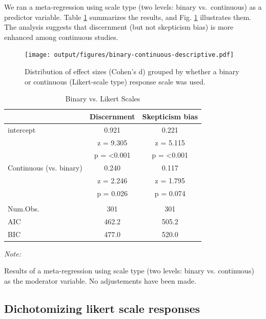 \documentclass[
  doc,floatsintext]{apa6}
\begin{document}
We ran a meta-regression using scale type (two levels: binary vs.~continuous) as a predictor variable. Table \ref{tab:binary-vs-continuous-regression} summarizes the results, and Fig. \ref{fig:binary-continuous-descriptive} illustrates them. The analysis suggests that discernment (but not skepticism bias) is more enhanced among continuous studies.



\begin{figure}
\centering
\texttt{[image: output/figures/binary-continuous-descriptive.pdf]}
\caption{\label{fig:binary-continuous-descriptive}Distribution of effect sizes (Cohen's d) grouped by whether a binary or continuous (Likert-scale type) response scale was used.}
\end{figure}

\begin{table}
\centering
\caption{\label{tab:binary-vs-continuous-regression}Binary vs. Likert Scales}
\centering
\begin{threeparttable}
\begin{tabular}[t]{lcc}
\toprule
  & Discernment & Skepticism  bias\\
\midrule
intercept & 0.921 & 0.221\\
 & z = 9.305 & z = 5.115\\
 & p = <0.001 & p = <0.001\\
Continuous (vs. binary) & 0.240 & 0.117\\
 & z = 2.246 & z = 1.795\\
 & p = 0.026 & p = 0.074\\
\midrule\\
Num.Obs. & 301 & 301\\
AIC & 462.2 & 505.2\\
BIC & 477.0 & 520.0\\
\bottomrule
\end{tabular}
\begin{tablenotes}
\item \textit{Note: } 
\item Results of a meta-regression using scale type (two levels: binary vs. continuous) as the moderator variable. No adjustements have been made.
\end{tablenotes}
\end{threeparttable}
\end{table}

\subsection{Dichotomizing likert scale responses}\label{dichotomizing-likert-scale-responses}
\end{document}
